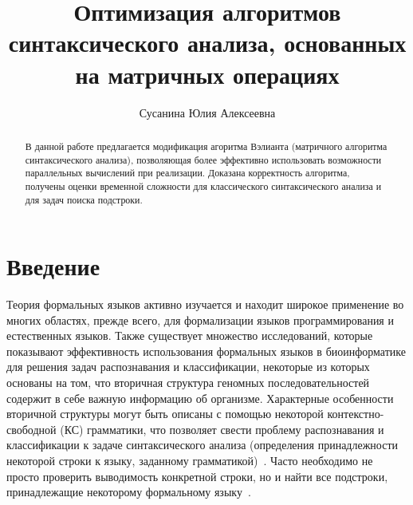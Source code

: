\renewcommand{\algorithmcfname}{Алгоритм}

\title{Оптимизация алгоритмов синтаксического анализа, основанных на матричных операциях}


\author{Сусанина Юлия Алексеевна}



\maketitle

\begin{abstract}
В данной работе предлагается модификация агоритма Вэлианта (матричного алгоритма синтаксического анализа), позволяющая более эффективно использовать возможности параллельных вычислений при реализации. Доказана корректность алгоритма, получены оценки временной сложности для классического синтаксического анализа и для задач поиска подстроки.
\end{abstract}

\section*{Введение}

Теория формальных языков активно изучается и находит широкое применение во многих областях, прежде всего, для формализации языков программирования и естественных языков.
Также существует множество исследований, которые показывают эффективность использования формальных языков в биоинформатике  для решения задач распознавания и классификации, некоторые из которых основаны на том, что вторичная структура геномных последовательностей содержит в себе важную информацию об организме.
Характерные особенности вторичной структуры могут быть описаны с помощью некоторой контекстно-свободной (КС) грамматики, что позволяет свести проблему распознавания и классификации к задаче синтаксического анализа (определения принадлежности некоторой строки к языку, заданному грамматикой)~\cite{dowell2004evaluation, knudsen1999rna, rivas2000language}.
Часто необходимо не просто проверить выводимость конкретной строки, но и найти все подстроки, принадлежащие некоторому формальному языку~\cite{durbin1996biological}.

